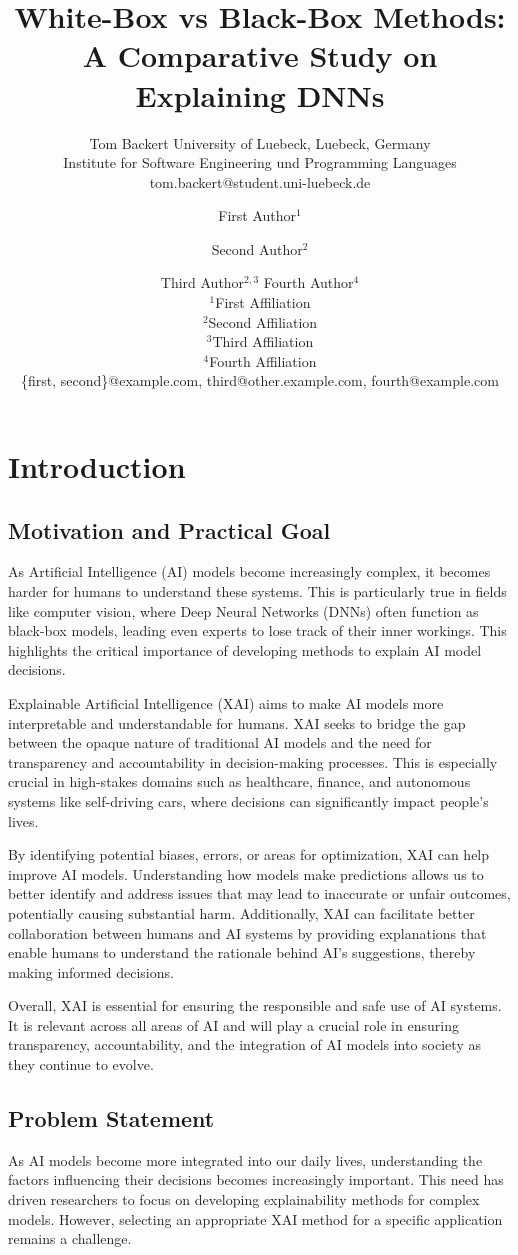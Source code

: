 \documentclass{article}
\title{White-Box vs Black-Box Methods: A Comparative Study on Explaining DNNs}
\author{
    Tom Backert
    \affiliations
    University of Luebeck, Luebeck, Germany\\
    Institute for Software Engineering und Programming Languages
    \emails
    tom.backert@student.uni-luebeck.de
}
\author{
First Author$^1$
\and
Second Author$^2$\and
Third Author$^{2,3}$\And
Fourth Author$^4$\\
\affiliations
$^1$First Affiliation\\
$^2$Second Affiliation\\
$^3$Third Affiliation\\
$^4$Fourth Affiliation\\
\emails
\{first, second\}@example.com,
third@other.example.com,
fourth@example.com
}
\begin{document}
\maketitle

\begin{abstract}
\end{abstract}

\section{Introduction}
\subsection{Motivation and Practical Goal}
As Artificial Intelligence (AI) models become increasingly complex, it becomes harder for humans to understand these systems. This is particularly true in fields like computer vision, where Deep Neural Networks (DNNs) often function as black-box models, leading even experts to lose track of their inner workings. This highlights the critical importance of developing methods to explain AI model decisions.

Explainable Artificial Intelligence (XAI) aims to make AI models more interpretable and understandable for humans. XAI seeks to bridge the gap between the opaque nature of traditional AI models and the need for transparency and accountability in decision-making processes. This is especially crucial in high-stakes domains such as healthcare, finance, and autonomous systems like self-driving cars, where decisions can significantly impact people’s lives.

By identifying potential biases, errors, or areas for optimization, XAI can help improve AI models. Understanding how models make predictions allows us to better identify and address issues that may lead to inaccurate or unfair outcomes, potentially causing substantial harm. Additionally, XAI can facilitate better collaboration between humans and AI systems by providing explanations that enable humans to understand the rationale behind AI’s suggestions, thereby making informed decisions.

Overall, XAI is essential for ensuring the responsible and safe use of AI systems. It is relevant across all areas of AI and will play a crucial role in ensuring transparency, accountability, and the integration of AI models into society as they continue to evolve.



\subsection{Problem Statement}
As AI models become more integrated into our daily lives, understanding the factors influencing their decisions becomes increasingly important. This need has driven researchers to focus on developing explainability methods for complex models. However, selecting an appropriate XAI method for a specific application remains a challenge.
\end{document}
